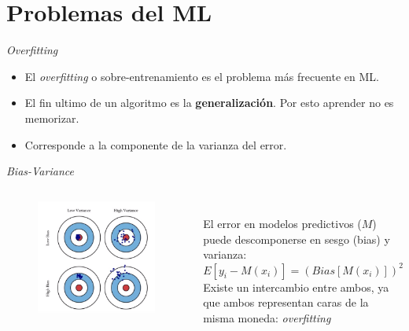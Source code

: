 \documentclass[11pt]{beamer}
\begin{document}
\section{Problemas del ML}
\begin{frame}{\textit{Overfitting}}
    \begin{itemize}
        \item El \textit{overfitting} o sobre-entrenamiento es el problema m\'as frecuente en ML.
        \item El fin ultimo de un algoritmo es la \textbf{generalizaci\'on}. Por esto aprender no es memorizar.
        \item Corresponde a la componente de la varianza del error.
    \end{itemize}
\end{frame}
\begin{frame}{\textit{Bias-Variance}}
\begin{columns}[T]
 \begin{column}{0.4\textwidth}
\begin{figure}
    \includegraphics[width=\textwidth]{images/bias-variance.png}
    \label{fig:my_label}
\end{figure}
 \end{column}
\begin{column}{0.6\textwidth}
\\
El error en modelos predictivos ($M$) puede descomponerse en sesgo (bias) y varianza:
\begin{displaymath}
E\left[y_i-M(x_i)\right] = (Bias\left[M(x_i)\right])^2 + Var\left[M(x_i)\right]
\end{displaymath}
Existe un intercambio entre ambos, ya que ambos representan caras de la misma moneda: \textit{overfitting}
\end{column}
\end{columns}
\end{frame}
\end{document}
